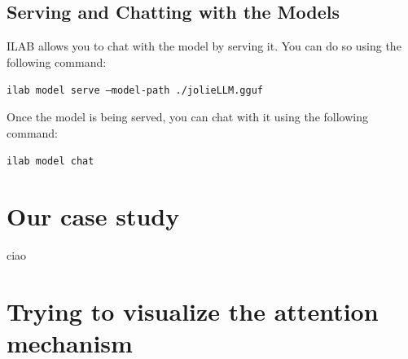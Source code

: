 \documentclass[12pt]{article}
\begin{document}
\subsection{Serving and Chatting with the Models}
ILAB allows you to chat with the model by serving it. You can do so using the following command:
\begin{center}
    \texttt{ilab model serve --model-path ./jolieLLM.gguf}
\end{center}
Once the model is being served, you can chat with it using the following command:
\begin{center}
    \texttt{ilab model chat}
\end{center}

\section{Our case study}
ciao

\section{Trying to visualize the attention mechanism}

\pagebreak


\end{document}
